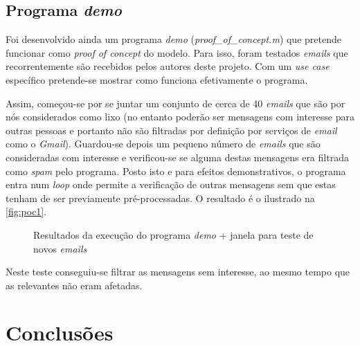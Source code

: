 \documentclass[a4paper,11pt,openright,oneside]{report}
\begin{document}
\section{Programa \textit{demo}}

Foi desenvolvido ainda um programa \textit{demo} (\textit{proof\_of\_concept.m})  que pretende funcionar como \textit{proof of concept} do modelo. Para isso, foram testados \textit{emails} que recorrentemente são recebidos pelos autores deste projeto. Com um \textit{use case} específico pretende-se mostrar como funciona efetivamente o programa.

Assim, começou-se por se juntar um conjunto de cerca de 40 \textit{emails} que são por nós considerados como lixo (no entanto poderão ser mensagens com interesse para outras pessoas e portanto não são filtradas por definição por serviços de \textit{email} como o \textit{Gmail}). Guardou-se depois um pequeno número de \textit{emails} que são consideradas com interesse e verificou-se se alguma destas mensagens era filtrada como \textit{spam} pelo programa. Posto isto e para efeitos demonstrativos, o programa entra num \textit{loop} onde permite a verificação de outras mensagens sem que estas tenham de ser previamente pré-processadas. O resultado é o ilustrado na \autoref{fig:poc1}.

\begin{figure}[ht]
\center
{}
\caption{Resultados da execução do programa \textit{demo} + janela para teste de novos \textit{emails}}
\label{fig:poc1}
\end{figure}

Neste teste conseguiu-se filtrar as mensagens sem interesse, ao mesmo tempo que as relevantes não eram afetadas.

\chapter{Conclusões}
\label{chap.conclusões}
\end{document}
